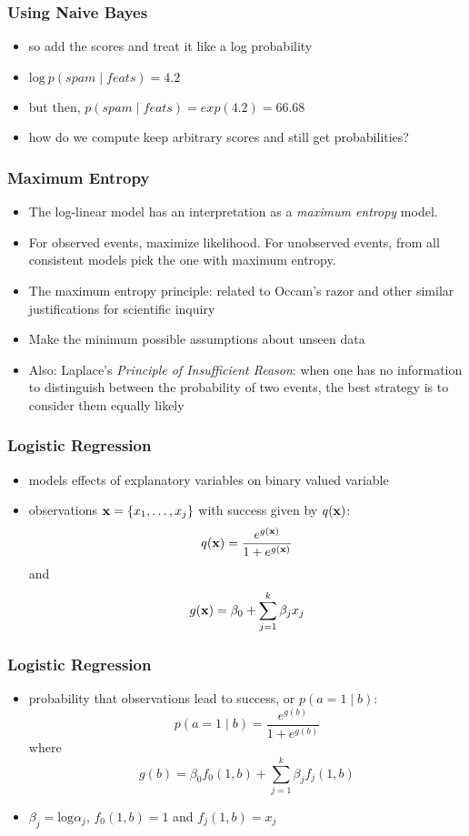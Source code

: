 \begin{frame}
\frametitle{Using Naive Bayes}
\begin{itemize}[<+->]
\item so add the scores and treat it like a log probability
\item $\textrm{log}\ p(\textit{spam} \mid \textit{feats}) = 4.2$
\item but then, $p(\textit{spam} \mid \textit{feats}) = exp(4.2) = 66.68$
\item how do we compute keep arbitrary scores and still get probabilities?
\end{itemize}
\end{frame}

\begin{frame}
\frametitle{Maximum Entropy}
\begin{itemize}[<+->]
\item The log-linear model has an interpretation as a {\it maximum entropy} model.
\item For observed events, maximize likelihood. For unobserved events, from all
consistent models pick the one with maximum entropy.
\item The maximum entropy principle: related to Occam's razor and
  other similar justifications for scientific inquiry
\item Make the minimum possible assumptions about unseen data
\item Also: Laplace's {\em Principle of Insufficient Reason}: when one
  has no information to distinguish between the probability of two
  events, the best strategy is to consider them equally likely
\end{itemize}
\end{frame}

\begin{frame}
\frametitle{Logistic Regression}
\begin{itemize}
\item models effects of explanatory variables on binary valued
  variable
\item observations ${\bf x} = \{x_1, \ldots, x_j\}$ with success given
  by $q({\bf x})$: \[ q({\bf x}) = \frac{e^{g({\bf x})}}{1 + e^{g({\bf
  x})}} \] and \[ g({\bf x}) = \beta_0 + \sum_{j=1}^{k} \beta_j x_j \]
\end{itemize} 
\end{frame} 

\begin{frame}
\frametitle{Logistic Regression}
\begin{itemize}
\item probability that observations lead to success, or $p(a=1 \mid
  b)$:
 \[ p(a=1 \mid b) = \frac{e^{g(b)}}{1 + e^{g(b)}} \] where
 \[ g(b) = \beta_0 f_0(1,b) + \sum_{j=1}^{k} \beta_j f_j(1,b) \]
\item $\beta_j = \textrm{log} \alpha_j$, $f_0(1,b) = 1$ and $f_j(1,b) = x_j$
\end{itemize} 
\end{frame} 
